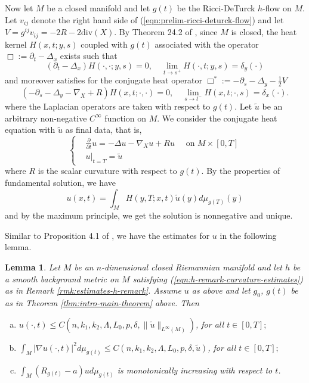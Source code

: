 \documentclass[12pt]{amsart}
\newcommand{\del}{\nabla}
\newtheorem{lma}[thm]{Lemma}
\theoremstyle{remark}
\numberwithin{equation}{section}
\begin{document}
Now let $M$ be a closed manifold and let $g(t)$ be the Ricci-DeTurck $h$-flow on $M$. Let $v_{ij}$ denote the right hand side of (\ref{eqn:prelim-ricci-deturck-flow}) and let $V = g^{ij}v_{ij} = -2R - 2\text{div}(X)$. By Theorem 24.2 of \cite{chow_ricci_2010}, since $M$ is closed, the heat kernel $H(x,t;y,s)$ coupled with  $g(t)$ associated with the operator $\Box:= \partial_t - \Delta_x$ exists such that
\begin{equation*}
    \left(\partial_t - \Delta_x\right)H(\cdot,\cdot;y,s) = 0, \quad \lim\limits_{t\to s^+}H(\cdot,t;y,s) = \delta_y(\cdot)
\end{equation*}
and moreover satisfies for the conjugate heat operator $\Box^\ast:= -\partial_s - \Delta_y - \frac{1}{2}V$
\begin{equation*}
    \left(-\partial_s - \Delta_y - \del_X + R\right)H(x,t;\cdot,\cdot) = 0, \quad \lim\limits_{s\to t^-}H(x,t;\cdot,s) = \delta_x(\cdot).
\end{equation*}
where the Laplacian operators are taken with respect to $g(t)$. Let $\tilde{u}$ be an arbitrary non-negative $C^\infty$ function on $M$. We consider the conjugate heat equation with $\tilde{u}$ as final data, that is,
\begin{equation}\label{eqn:conjugate-heat-eqn}
    \begin{cases}
        &\frac{\partial}{\partial t} u = -\Delta u - \del_X u + Ru \quad \text{ on } M \times[0,T] \\
        &u\big|_{t=T} = \tilde{u}
    \end{cases}
\end{equation}
where $R$ is the scalar curvature with respect to $g(t)$. By the properties of fundamental solution, we have
\begin{equation*}
    u(x,t) = \int_M H(y,T;x,t)\tilde{u}(y)d\mu_{g(T)}(y)
\end{equation*}
and by the maximum principle, we get the solution is nonnegative and unique.

Similar to Proposition 4.1 of \cite{jiang_weak_2021}, we have the estimates for $u$ in the following lemma.
\begin{lma}\label{lem:conjugate-heat-equation-estimates}
    Let $M$ be an $n$-dimensional closed Riemannian manifold and let $h$ be a smooth background metric on $M$ satisfying (\ref{eqn:h-remark-curvature-estimates}) as in Remark \ref{rmk:estimates-h-remark}. Assume $u$ as above and let $g_0$, $g(t)$ be as in Theorem \ref{thm:intro-main-theorem} above. Then
    \begin{enumerate}[(a)]
        \item $u(\cdot,t) \leq C(n,k_1,k_2,\Lambda,L_0,p,\delta,\lVert\tilde{u}\rVert_{L^\infty(M)})$, for all $t \in [0,T];$
        \item $\int_M |\del u(\cdot,t)|^2 d\mu_{g(t)} \leq C(n,k_1,k_2,\Lambda,L_0,p,\delta,\tilde{u})$, for all $t \in [0,T];$
        \item $\int_M (R_{g(t)} - a)u d\mu_{g(t)}$ is monotonically increasing with respect to $t$.
    \end{enumerate}
\end{lma}
\end{document}
